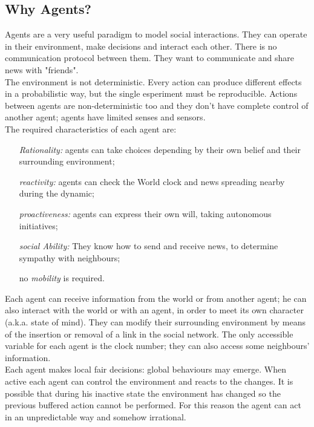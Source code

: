 \subsection{Why Agents?}
Agents are a very useful paradigm to model social interactions. 
They can operate in their environment, make decisions and interact each other.
There is no communication protocol between them. They want to communicate and share news with "friends". \\
The environment is not deterministic. 
Every action can produce different effects in a probabilistic way, but the single esperiment must be reproducible.
Actions between agents are non-deterministic too and they don't have complete control of another
agent; agents have limited senses and sensors.
\\
The required characteristics of each agent are: \begin{itemize}
\item [\textit {Rationality:}] agents can take choices depending by their own belief and their surrounding environment;
\item [\textit {reactivity:}] agents can check the World clock and news spreading nearby during the dynamic;
\item [\textit {proactiveness:}] agents can express their own will, taking autonomous initiatives;
\item [\textit {social Ability:}] They know how to send and receive news, to determine sympathy with neighbours;
\item [no \textit{mobility}] is required. 
\end{itemize}

Each agent can receive information from the world or from another agent; he can also interact with 
the world or with an agent, in order to meet its own character (a.k.a. state of mind).
They can modify their surrounding environment by means of the insertion or removal of a link in the social network.
The only accessible variable for each agent is the clock number; they can also access some neighbours' information.
\\
Each agent makes local fair decisions: global behaviours may emerge.
When active each agent can control the environment and reacts to the changes. 
It is possible that during his inactive state the environment has changed so the previous buffered action cannot be performed.
For this reason the agent can act in an unpredictable way and somehow irrational.
